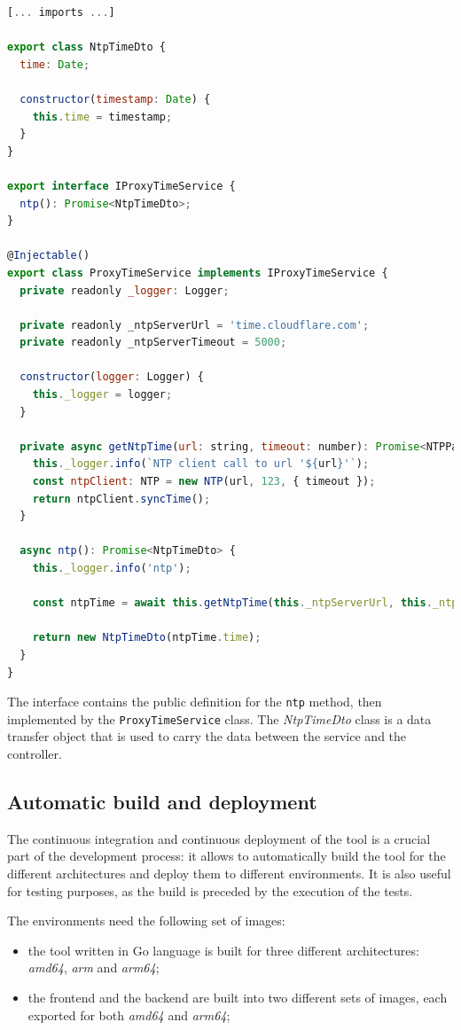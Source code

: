 \begin{lstlisting}[language=Javascript, caption={Proxy service class}, label={lst:proxy-service}]
[... imports ...]

export class NtpTimeDto {
  time: Date;

  constructor(timestamp: Date) {
    this.time = timestamp;
  }
}

export interface IProxyTimeService {
  ntp(): Promise<NtpTimeDto>;
}

@Injectable()
export class ProxyTimeService implements IProxyTimeService {
  private readonly _logger: Logger;

  private readonly _ntpServerUrl = 'time.cloudflare.com';
  private readonly _ntpServerTimeout = 5000;

  constructor(logger: Logger) {
    this._logger = logger;
  }

  private async getNtpTime(url: string, timeout: number): Promise<NTPPacket> {
    this._logger.info(`NTP client call to url '${url}'`);
    const ntpClient: NTP = new NTP(url, 123, { timeout });
    return ntpClient.syncTime();
  }

  async ntp(): Promise<NtpTimeDto> {
    this._logger.info('ntp');

    const ntpTime = await this.getNtpTime(this._ntpServerUrl, this._ntpServerTimeout);

    return new NtpTimeDto(ntpTime.time);
  }
}
\end{lstlisting}

The interface contains the public definition for the \texttt{ntp} method, then implemented by the \texttt{ProxyTimeService} class. The \textit{NtpTimeDto} class is a data transfer object that is used to carry the data between the service and the controller.

\subsection{Automatic build and deployment}

The continuous integration and continuous deployment of the tool is a crucial part of the development process: it allows to automatically build the tool for the different architectures and deploy them to different environments. It is also useful for testing purposes, as the build is preceded by the execution of the tests.

The environments need the following set of images:
\begin{itemize}
  \item the tool written in Go language is built for three different architectures: \textit{amd64}, \textit{arm} and \textit{arm64};
  \item the frontend and the backend are built into two different sets of images, each exported for both \textit{amd64} and \textit{arm64};
\end{itemize}

